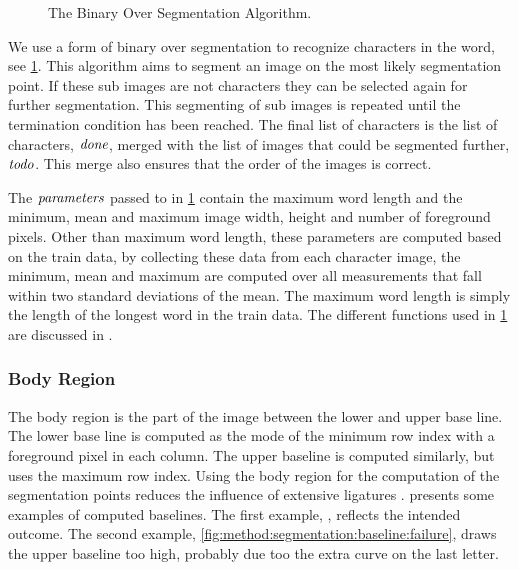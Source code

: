 \newcommand{\body}{\ensuremath{\t{body}}\xspace}
\newcommand{\strokewidth}{\ensuremath{\t{stroke\_w}}\xspace}
\newcommand{\segmentationpoints}{\ensuremath{\t{sps}}\xspace}
\newcommand{\segmentationpoint}{\ensuremath{\t{sp}}\xspace}
\newcommand{\image}{\ensuremath{\t{image}}\xspace}
\newcommand{\subimage}{\ensuremath{\t{sub\_image}}\xspace}
\newcommand{\leftsubimage}{\ensuremath{\t{left}}\xspace}
\newcommand{\rightsubimage}{\ensuremath{\t{right}}\xspace}
\newcommand{\segmentfurther}{\ensuremath{\t{todo}}\xspace}
\newcommand{\characters}{\ensuremath{\t{done}}\xspace}
\newcommand{\parameters}{\ensuremath{\t{parameters}}\xspace}
%
\begin{figure}[b!]
	
	\caption{The Binary Over Segmentation Algorithm.}
	\label{alg:method:segmentation:algorithm}
\end{figure}
We use a form of binary over segmentation to recognize characters in the word, see \cref{alg:method:segmentation:algorithm}. This algorithm aims to segment an image on the most likely segmentation point. If these sub images are not characters they can be selected again for further segmentation. This segmenting of sub images is repeated until the termination condition has been reached. The final list of characters is the list of characters, \characters, merged with the list of images that could be segmented further, \segmentfurther. This merge also ensures that the order of the images is correct.

The \parameters passed to  in \cref{alg:method:segmentation:algorithm} contain the maximum word length and the minimum, mean and maximum image width, height and number of foreground pixels. Other than maximum word length, these parameters are computed based on the train data, by collecting these data from each character image, the minimum, mean and maximum are computed over all measurements that fall within two standard deviations of the mean. The maximum word length is simply the length of the longest word in the train data. The different functions used in \cref{alg:method:segmentation:algorithm} are discussed in .

\subsubsection{Body Region}
\label{sss:method:segmentaton:bodyregion}
	The body region is the part of the image between the lower and upper base line. The lower base line is computed as the mode of the minimum row index with a foreground pixel in each column. The upper baseline is computed similarly, but uses the maximum row index. Using the body region for the computation of the segmentation points reduces the influence of extensive ligatures \cite{lee2012binary}.  presents some examples of computed baselines. The first example, , reflects the intended outcome. The second example, \cref{fig:method:segmentation:baseline:failure}, draws the upper baseline too high, probably due too the extra curve on the last letter.

